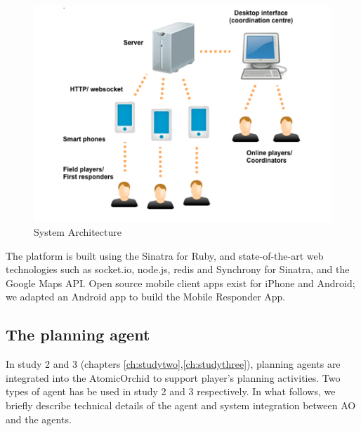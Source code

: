 \begin{figure}[h]
  \centering
  \includegraphics[width=1\textwidth]{img/approach/systemArchitecture}
  \caption{System Architecture}
  \label{fig:sysArchitecture}
\end{figure}

The platform is built using the Sinatra for Ruby, and state-of-the-art web technologies such as socket.io, node.js, redis and Synchrony for Sinatra, and the Google Maps API. Open source mobile client apps exist for iPhone and Android; we adapted an Android app to build the Mobile Responder App.\\


\subsection{The planning agent}
In study 2 and 3 (chapters \ref{ch:studytwo},\ref{ch:studythree}), planning agents are integrated into the AtomicOrchid to support player's planning activities. Two types of agent has be used in study 2 and 3 respectively. In what follows, we briefly describe technical details of the agent and system integration between AO and the agents.  \\


